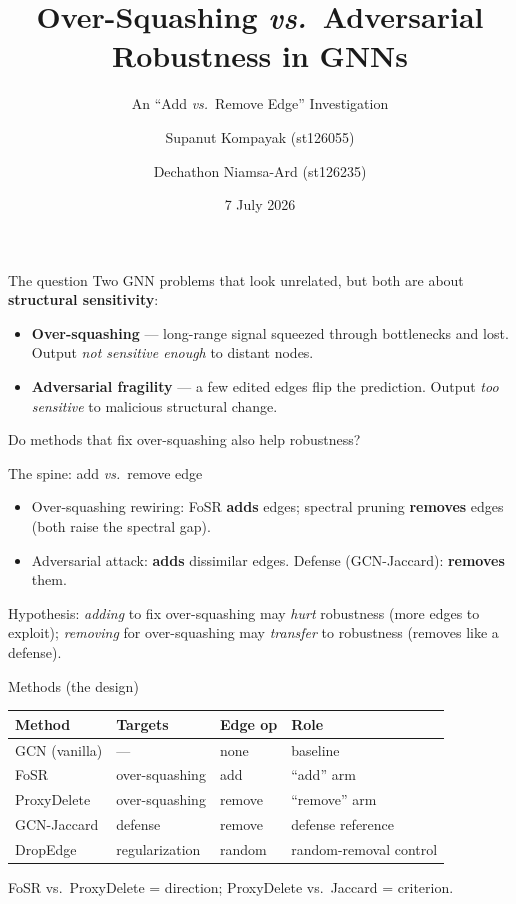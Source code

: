 \documentclass[aspectratio=169]{beamer}
\title[Over-Squashing vs.\ Robustness]{Over-Squashing \emph{vs.}\ Adversarial Robustness in GNNs}
\subtitle{An ``Add \emph{vs.}\ Remove Edge'' Investigation}
\author[Kompayak, Niamsa-Ard]{Supanut Kompayak (st126055) \and Dechathon Niamsa-Ard (st126235)}
\institute[AIT]{Deep Learning Course Project, Asian Institute of Technology}
\date{7 July 2026}
\begin{document}
\frame{\titlepage}

\begin{frame}{The question}
  Two GNN problems that look unrelated, but both are about \textbf{structural sensitivity}:
  \begin{itemize}
    \item \textbf{Over-squashing} --- long-range signal squeezed through bottlenecks and lost.
      Output \emph{not sensitive enough} to distant nodes.
    \item \textbf{Adversarial fragility} --- a few edited edges flip the prediction.
      Output \emph{too sensitive} to malicious structural change.
  \end{itemize}
  \vfill
  \centering\Large Do methods that fix over-squashing also help robustness?
\end{frame}

\begin{frame}{The spine: add \emph{vs.}\ remove edge}
  \begin{itemize}
    \item Over-squashing rewiring: FoSR \textbf{adds} edges; spectral pruning \textbf{removes} edges
      (both raise the spectral gap).
    \item Adversarial attack: \textbf{adds} dissimilar edges. Defense (GCN-Jaccard): \textbf{removes} them.
  \end{itemize}
  \vfill
  Hypothesis: \emph{adding} to fix over-squashing may \emph{hurt} robustness (more edges to exploit);
  \emph{removing} for over-squashing may \emph{transfer} to robustness (removes like a defense).
\end{frame}

\begin{frame}{Methods (the design)}
  \centering
  \begin{tabular}{@{}llll@{}}
    \toprule
    Method & Targets & Edge op & Role \\
    \midrule
    GCN (vanilla)        & ---            & none   & baseline \\
    FoSR                 & over-squashing & add    & ``add'' arm \\
    ProxyDelete          & over-squashing & remove & ``remove'' arm \\
    GCN-Jaccard          & defense        & remove & defense reference \\
    DropEdge             & regularization & random & random-removal control \\
    \bottomrule
  \end{tabular}
  \vfill
  \footnotesize FoSR vs.\ ProxyDelete = direction; ProxyDelete vs.\ Jaccard = criterion.
\end{frame}
\end{document}
